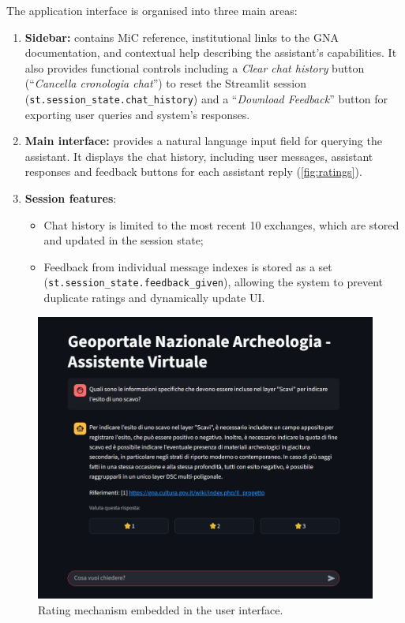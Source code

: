 \begin{spacing}{1.5}
\noindent The application interface is organised into three main areas:
\begin{enumerate}
      \item \textbf{Sidebar:} contains MiC reference, institutional links to the GNA documentation, and contextual help describing the assistant’s capabilities. It also provides functional controls including a \textit{Clear chat history} button (``\textit{Cancella cronologia chat}'') to reset the Streamlit session (\texttt{st.session\_state.chat\_history}) and a ``\textit{Download Feedback}'' button for exporting user queries and system's responses.
      \item \textbf{Main interface:} provides a natural language input field for querying the assistant. It displays the chat history, including user messages, assistant responses and feedback buttons for each assistant reply (\autoref{fig:ratings}).
      \item \textbf{Session features}: 
      \begin{itemize}
            \item Chat history is limited to the most recent 10 exchanges, which are stored and updated in the session state;
            \item Feedback from individual message indexes is stored as a set (\texttt{st.session\_state.feedback\_given}), allowing the system to prevent duplicate ratings and dynamically update UI.
      \end{itemize}
\end{enumerate}


\begin{figure}[H]
  \centering
  \includegraphics[width=\textwidth]{images/ui_ratings.png} 
  \caption{Rating mechanism embedded in the user interface.}
  \label{fig:ratings}
\end{figure}


\end{spacing}
